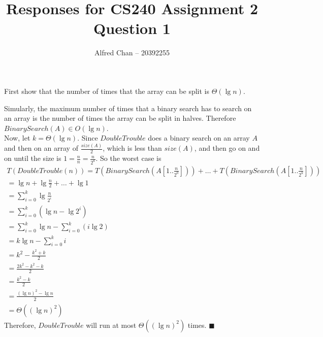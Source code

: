 \documentclass[12pt]{article}
\title{Responses for CS240 Assignment 2 Question 1}
\author{Alfred Chan -- 20392255}
\begin{document}
\maketitle
First show that the number of times that the array can be split is $\Theta(\lg n)$.

Simularly, the maximum number of times that a binary search has to search on an array is the number of times the array can be split in halves.
Therefore $BinarySearch(A) \in O(\lg n)$.\\

Now, let $k = \Theta(\lg n)$.
Since $DoubleTrouble$ does a binary search on an array $A$ and then on an array of $\frac{size(A)}{2}$, which is less than $size(A)$, and then go on and on until the size is 
$1 = \frac{n}{n} = \frac{n}{2^k}$.
So the worst case is
\begin{gather*}
T(DoubleTrouble(n)) = T(BinarySearch(A[1..\frac{n}{2^0}])) + \dots + T(BinarySearch(A[1 .. \frac{n}{2^k}]))\\
	= \lg n + \lg\frac{n}{2} + \dots + \lg 1\\
	= \sum_{i=0}^{k} \lg \frac{n}{2^i}\\
	= \sum_{i=0}^{k} (\lg n - \lg 2^{i})\\
	= \sum_{i=0}^{k} \lg n - \sum_{i=0}^{k} (i \lg 2)\\
	= k\lg n - \sum_{i=0}^{k} i\\
	= k^2 - \frac{k^2 + k}{2}\\
	= \frac{2k^2 - k^2 - k}{2}\\
	= \frac{k^2 - k}{2}\\
	= \frac{(\lg n)^2 - \lg n}{2}\\
	= \Theta((\lg n)^2)
\end{gather*}
Therefore, $DoubleTrouble$ will run at most $\Theta((\lg n)^2)$ times.
\hfill $\blacksquare$
\end{document}
